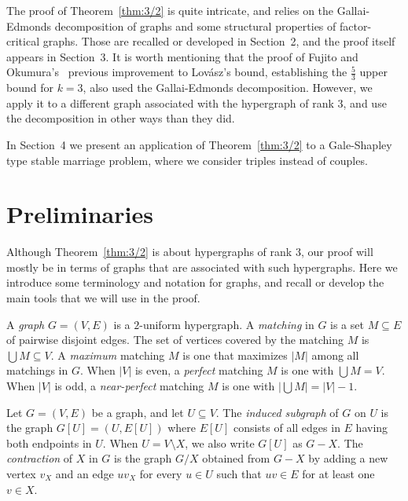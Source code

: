 \documentclass[10pt,a4paper]{amsart}
\begin{document}
The proof of Theorem~\ref{thm:3/2} is quite intricate, and relies on the Gallai-Edmonds decomposition of graphs and some structural properties of factor-critical graphs. Those are recalled or developed in Section~2, and the proof itself appears in Section~3. It is worth mentioning that the proof of Fujito and Okumura's~\cite{FO} previous improvement to Lov\'asz's bound, establishing the $\frac{5}{3}$ upper bound for $k=3$, also used the Gallai-Edmonds decomposition. However, we apply it to a different graph associated with the hypergraph of rank $3$, and use the decomposition in other ways than they did.

In Section~4 we present an application of Theorem~\ref{thm:3/2} to a Gale-Shapley type stable marriage problem, where we consider triples instead of couples.

\section{Preliminaries}
Although Theorem~\ref{thm:3/2} is about hypergraphs of rank $3$, our proof will mostly be in terms of graphs that are associated with such hypergraphs. Here we introduce some terminology and notation for graphs, and recall or develop the main tools that we will use in the proof.

A \emph{graph} $G=(V,E)$ is a $2$-uniform hypergraph. A \emph{matching} in $G$ is a set $M \subseteq E$ of pairwise disjoint edges. The set of vertices covered by the matching $M$ is $\bigcup M \subseteq V$. A \emph{maximum} matching $M$ is one that maximizes $|M|$ among all matchings in $G$. When $|V|$ is even, a \emph{perfect} matching $M$ is one with $\bigcup M = V$. When $|V|$ is odd, a \emph{near-perfect} matching $M$ is one with $|\bigcup M| = |V| - 1$.

Let $G=(V,E)$ be a graph, and let $U \subseteq V$. The \emph{induced subgraph} of $G$ on $U$ is the graph $G[U] = (U, E[U])$ where $E[U]$ consists of all edges in $E$ having both endpoints in $U$. When $U = V \setminus X$, we also write $G[U]$ as $G - X$. The \emph{contraction} of $X$ in $G$ is the graph $G/X$ obtained from $G - X$ by adding a new vertex $v_X$ and an edge $uv_X$ for every $u \in U$ such that $uv \in E$ for at least one $v \in X$.
\end{document}
